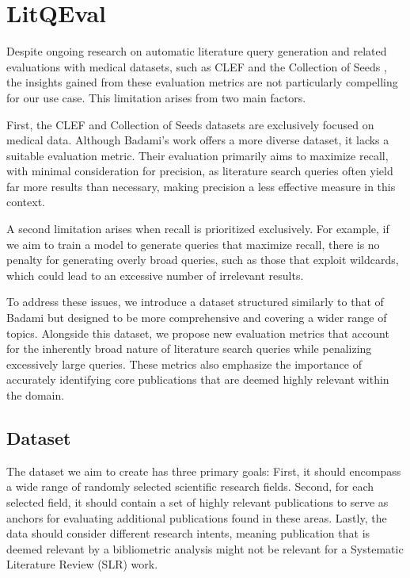 \chapter{LitQEval}\label{ch:ownApproach}
Despite ongoing research on automatic literature query generation and related evaluations with medical datasets, such as CLEF \autocite{kanoulas2017clef, kanoulas2018clef, kanoulas2019clef} and the Collection of Seeds \autocite{Wang_2022}, the insights gained from these evaluation metrics are not particularly compelling for our use case. This limitation arises from two main factors. 

First, the CLEF and Collection of Seeds datasets are exclusively focused on medical data. Although Badami's work \autocite{badami2023adaptive} offers a more diverse dataset, it lacks a suitable evaluation metric. Their evaluation primarily aims to maximize recall, with minimal consideration for precision, as literature search queries often yield far more results than necessary, making precision a less effective measure in this context. 

A second limitation arises when recall is prioritized exclusively. For example, if we aim to train a model to generate queries that maximize recall, there is no penalty for generating overly broad queries, such as those that exploit wildcards, which could lead to an excessive number of irrelevant results.

To address these issues, we introduce a dataset structured similarly to that of Badami \autocite{badami2023adaptive} but designed to be more comprehensive and covering a wider range of topics. Alongside this dataset, we propose new evaluation metrics that account for the inherently broad nature of literature search queries while penalizing excessively large queries. These metrics also emphasize the importance of accurately identifying core publications that are deemed highly relevant within the domain.


\section{Dataset}\label{sec:dataset}
The dataset we aim to create has three primary goals: First, it should encompass a wide range of randomly selected scientific research fields. Second, for each selected field, it should contain a set of highly relevant publications to serve as anchors for evaluating additional publications found in these areas. Lastly, the data should consider different research intents, meaning publication that is deemed relevant by a bibliometric analysis might not be relevant for a Systematic Literature Review (SLR) work.

